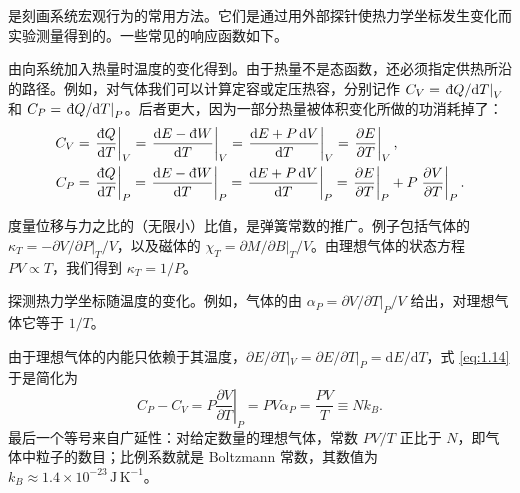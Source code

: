 
是刻画系统宏观行为的常用方法。它们是通过用外部探针使热力学坐标发生变化而实验测量得到的。一些常见的响应函数如下。

由向系统加入热量时温度的变化得到。由于热量不是态函数，还必须指定供热所沿的路径。例如，对气体我们可以计算定容或定压热容，分别记作 $C_V=\left.\inexd Q/\mathrm{d}T\right|_V$ 和 $C_P=\left.\inexd Q/\mathrm{d}T\right|_P$。后者更大，因为一部分热量被体积变化所做的功消耗掉了：
\begin{equation}
\begin{aligned}
C_V&=\left.\frac{\inexd Q}{\mathrm{d}T}\right|_V=\left.\frac{\mathrm{d}E-\inexd W}{\mathrm{d}T}\right|_V=\left.\frac{\mathrm{d}E+P\,\mathrm{d}V}{\mathrm{d}T}\right|_V=\left.\frac{\partial E}{\partial T}\right|_V,\\
C_P&=\left.\frac{\inexd Q}{\mathrm{d}T}\right|_P=\left.\frac{\mathrm{d}E-\inexd W}{\mathrm{d}T}\right|_P=\left.\frac{\mathrm{d}E+P\,\mathrm{d}V}{\mathrm{d}T}\right|_P=\left.\frac{\partial E}{\partial T}\right|_P+P\left.\frac{\partial V}{\partial T}\right|_P.
\end{aligned}
\label{eq:1.14}
\end{equation}

度量位移与力之比的（无限小）比值，是弹簧常数的推广。例子包括气体的 $\kappa_T=-\partial V/\partial P|_T/V$，以及磁体的 $\chi_T=\partial M/\partial B|_T/V$。由理想气体的状态方程 $PV\propto T$，我们得到 $\kappa_T=1/P$。

探测热力学坐标随温度的变化。例如，气体的由 $\alpha_P=\partial V/\partial T|_P/V$ 给出，对理想气体它等于 $1/T$。

由于理想气体的内能只依赖于其温度，$\partial E/\partial T|_V=\partial E/\partial T|_P=\mathrm{d}E/\mathrm{d}T$，式 \eqref{eq:1.14} 于是简化为
\begin{equation}
C_P-C_V=P\left.\frac{\partial V}{\partial T}\right|_P=PV\alpha_P=\frac{PV}{T}\equiv Nk_B.
\label{eq:1.15}
\end{equation}
最后一个等号来自广延性：对给定数量的理想气体，常数 $PV/T$ 正比于 $N$，即气体中粒子的数目；比例系数就是 Boltzmann 常数，其数值为 $k_B\approx1.4\times10^{-23}\,\mathrm{J\,K^{-1}}$。


